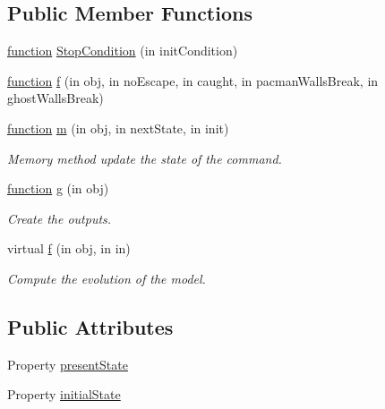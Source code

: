 \subsection*{Public Member Functions}
\begin{DoxyCompactItemize}
\item 
\hyperlink{_plan__desuma_functions__2_players_8m_ac2ffb26d6f42d3bbcd7847b0873403f4}{function} \hyperlink{class_stop_condition_a998151731b2f85cb0f3e0cbc7d82bf96}{Stop\+Condition} (in init\+Condition)
\item 
\hyperlink{_plan__desuma_functions__2_players_8m_ac2ffb26d6f42d3bbcd7847b0873403f4}{function} \hyperlink{class_stop_condition_aee61194740a59310c4197ba5d424d3be}{f} (in obj, in no\+Escape, in caught, in pacman\+Walls\+Break, in ghost\+Walls\+Break)
\item 
\hyperlink{_plan__desuma_functions__2_players_8m_ac2ffb26d6f42d3bbcd7847b0873403f4}{function} \hyperlink{class_stop_condition_a3140f24c6c4b80037b7d4f521c6ae2d3}{m} (in obj, in next\+State, in init)
\begin{DoxyCompactList}\small\item\em Memory method update the state of the command. \end{DoxyCompactList}\item 
\hyperlink{_plan__desuma_functions__2_players_8m_ac2ffb26d6f42d3bbcd7847b0873403f4}{function} \hyperlink{class_stop_condition_a07dadfabe92bf9a144b8a862720e7746}{g} (in obj)
\begin{DoxyCompactList}\small\item\em Create the outputs. \end{DoxyCompactList}\item 
virtual \hyperlink{class_model_s_e_d_ac36f9451c43b120828af4380858f2024}{f} (in obj, in in)
\begin{DoxyCompactList}\small\item\em Compute the evolution of the model. \end{DoxyCompactList}\end{DoxyCompactItemize}
\subsection*{Public Attributes}
\begin{DoxyCompactItemize}
\item 
Property \hyperlink{class_stop_condition_a9624cc7c421a50fa5086b0ebd0cd5fe3}{present\+State}
\item 
Property \hyperlink{class_stop_condition_acd9263acfa96c9138afdf497e55acc24}{initial\+State}
\end{DoxyCompactItemize}


